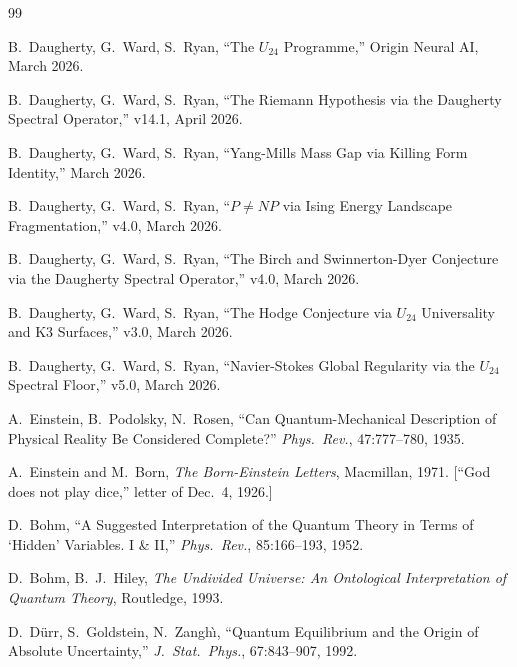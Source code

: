 \documentclass[12pt,a4paper]{article}
\theoremstyle{definition}
\theoremstyle{remark}
\begin{document}
\begin{thebibliography}{99}


 B.~Daugherty, G.~Ward, S.~Ryan, ``The $U_{24}$ Programme,''
  Origin Neural AI, March 2026.

 B.~Daugherty, G.~Ward, S.~Ryan, ``The Riemann Hypothesis via
  the Daugherty Spectral Operator,'' v14.1, April 2026.

 B.~Daugherty, G.~Ward, S.~Ryan, ``Yang-Mills Mass Gap via
  Killing Form Identity,'' March 2026.

 B.~Daugherty, G.~Ward, S.~Ryan, ``$P \neq NP$ via Ising
  Energy Landscape Fragmentation,'' v4.0, March 2026.

 B.~Daugherty, G.~Ward, S.~Ryan, ``The Birch and
  Swinnerton-Dyer Conjecture via the Daugherty Spectral Operator,'' v4.0,
  March 2026.

 B.~Daugherty, G.~Ward, S.~Ryan, ``The Hodge Conjecture via
  $U_{24}$ Universality and K3 Surfaces,'' v3.0, March 2026.

 B.~Daugherty, G.~Ward, S.~Ryan, ``Navier-Stokes Global
  Regularity via the $U_{24}$ Spectral Floor,'' v5.0, March 2026.


 A.~Einstein, B.~Podolsky, N.~Rosen, ``Can
  Quantum-Mechanical Description of Physical Reality Be Considered Complete?''
  \emph{Phys.\ Rev.}, 47:777--780, 1935.

 A.~Einstein and M.~Born, \emph{The Born-Einstein
  Letters}, Macmillan, 1971. [``God does not play dice,'' letter of
  Dec.~4, 1926.]


 D.~Bohm, ``A Suggested Interpretation of the Quantum Theory
  in Terms of `Hidden' Variables. I \& II,'' \emph{Phys.\ Rev.}, 85:166--193,
  1952.

 D.~Bohm, B.~J.~Hiley, \emph{The Undivided Universe:
  An Ontological Interpretation of Quantum Theory}, Routledge, 1993.

 D.~D\"urr, S.~Goldstein, N.~Zangh\`\i, ``Quantum
  Equilibrium and the Origin of Absolute Uncertainty,'' \emph{J.\ Stat.\ Phys.},
  67:843--907, 1992.


\end{thebibliography}
\end{document}
